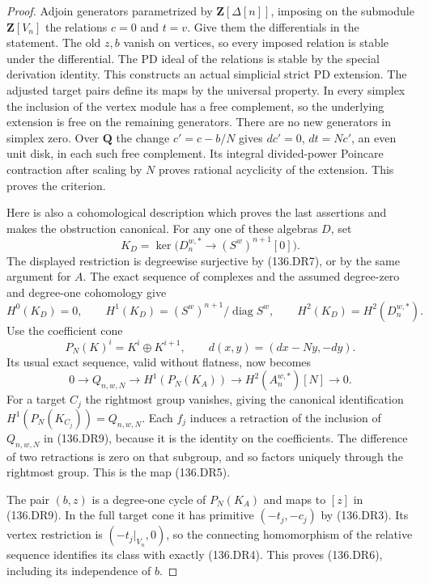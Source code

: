 \begin{proof}
Adjoin generators parametrized by $\mathbf Z[\Delta[n]]$,
imposing on the submodule $\mathbf Z[V_n]$ the relations
$c=0$ and $t=v$. Give them the differentials in the statement.
The old $z,b$ vanish on vertices, so every imposed relation
is stable under the differential. The PD ideal of the relations
is stable by the special derivation identity. This constructs
an actual simplicial strict PD extension. The adjusted target
pairs define its maps by the universal property. In every
simplex the inclusion of the vertex module has a free complement,
so the underlying extension is free on the remaining generators.
There are no new generators in simplex zero. Over $\mathbf Q$
the change $c'=c-b/N$ gives $dc'=0$, $dt=Nc'$, an even unit
disk, in each such free complement. Its integral divided-power
Poincare contraction after scaling by $N$ proves rational
acyclicity of the extension. This proves the criterion.

Here is also a cohomological description which proves the last
assertions and makes the obstruction canonical. For any one of
these algebras $D$, set
\[
 K_D=\ker\bigl(D_n^{w,*}\longrightarrow(S^w)^{n+1}[0]\bigr).
\]
The displayed restriction is degreewise surjective by (136.DR7),
or by the same argument for $A$. The exact sequence of complexes
and the assumed degree-zero and degree-one cohomology give
\[
 H^0(K_D)=0,\qquad
 H^1(K_D)=(S^w)^{n+1}/\operatorname{diag}S^w,
 \qquad H^2(K_D)=H^2(D_n^{w,*}).                         \tag{136.DR8}
\]
Use the coefficient cone
\[
 P_N(K)^i=K^i\oplus K^{i+1},\qquad
            d(x,y)=(dx-Ny,-dy).
\]
Its usual exact sequence, valid without flatness, now becomes
\[
 0\longrightarrow Q_{n,w,N}\longrightarrow H^1(P_N(K_A))
       \longrightarrow H^2(A_n^{w,*})[N]\longrightarrow0.
                                                               \tag{136.DR9}
\]
For a target $C_j$ the rightmost group vanishes, giving the
canonical identification $H^1(P_N(K_{C_j}))=Q_{n,w,N}$.
Each $f_j$ induces a retraction of the inclusion of $Q_{n,w,N}$
in (136.DR9), because it is the identity on the coefficients.
The difference of two retractions is zero on that subgroup,
and so factors uniquely through the rightmost group. This is
the map (136.DR5).

The pair $(b,z)$ is a degree-one cycle of $P_N(K_A)$ and maps
to $[z]$ in (136.DR9). In the full target cone it has primitive
$(-t_j,-c_j)$ by (136.DR3). Its vertex restriction is
$(-t_j|_{V_n},0)$, so the connecting homomorphism of the relative
sequence identifies its class with exactly (136.DR4).
This proves (136.DR6), including its independence of $b$.
\end{proof}

